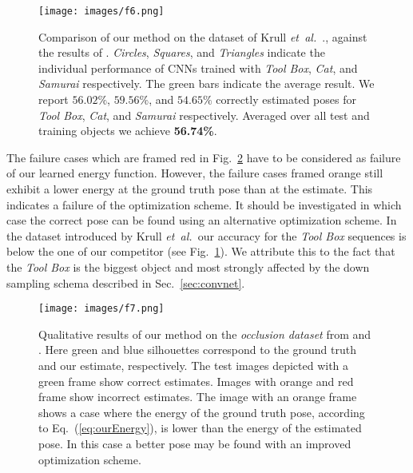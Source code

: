 \documentclass[10pt,letterpaper]{article}
\newcommand{\etal}{\mbox{\emph{et al.\ }}}
\begin{document}
\begin{figure}[!ht]
\begin{center}
\texttt{[image: images/f6.png]}
\end{center}
   \caption{Comparison of our method on the dataset of Krull \etal., against the results of \cite{brachmann2014}.  \emph{Circles}, \emph{Squares}, and \emph{Triangles} indicate the individual performance of CNNs trained with \emph{Tool Box}, \emph{Cat}, and \emph{Samurai} respectively. The green bars indicate the average result. We report $56.02\%$, $59.56\%$, and $54.65\%$ correctly estimated poses for \emph{Tool Box}, \emph{Cat}, and \emph{Samurai} respectively. Averaged over all test and training objects we achieve {\bf 56.74\%}.}
\label{fig:comp-accv14}
\end{figure}

The failure cases which are framed red in Fig.~\ref{fig:pose-results} have to be considered as failure of our learned energy function. However, the failure cases framed orange still exhibit a lower energy at the ground truth pose than at the estimate.
This indicates a failure of the optimization scheme. It should be investigated in which case the correct pose can be found using an alternative optimization scheme. 
In the dataset introduced by Krull \etal our accuracy for the \emph{Tool Box} sequences is below the one of our competitor (see Fig.~\ref{fig:comp-accv14}).
We attribute this to the fact that the \emph{Tool Box} is the biggest object and most strongly affected by the down sampling schema described in Sec.~\ref{sec:convnet}.

\begin{figure}[!ht]
\begin{center}
\texttt{[image: images/f7.png]}
\end{center}
   \caption{Qualitative results of our method on the \emph{occlusion dataset} from \cite{brachmann2014} and \cite{hinterstoisser2012accv}. Here green and blue silhouettes correspond to the ground truth and our estimate, respectively. The test images depicted with a green frame show correct estimates. Images with orange and red frame show incorrect estimates. The image with an orange frame shows a case where the energy of the ground truth pose, according to Eq.~(\ref{eq:ourEnergy}), is lower than the energy of the estimated pose. In this case a better pose may be found with an improved optimization scheme.}
\label{fig:pose-results}
\end{figure}
\end{document}

